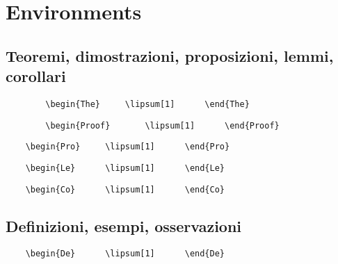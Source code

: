 \chapter{Environments}
\section{Teoremi, dimostrazioni, proposizioni, lemmi, corollari}
	\begin{verbatim}
		\begin{The}		\lipsum[1]		\end{The}
	\end{verbatim}
\begin{The}		\lipsum[1]		\end{The}

	\begin{verbatim}
		\begin{Proof}		\lipsum[1]		\end{Proof}
	\end{verbatim}
\begin{Proof}	\lipsum[2]		\end{Proof}

\begin{verbatim}
	\begin{Pro}		\lipsum[1]		\end{Pro}
\end{verbatim}
\begin{Pro}		\lipsum[3] 		\end{Pro}

\begin{verbatim}
	\begin{Le}		\lipsum[1]		\end{Le}
\end{verbatim}
\begin{Le}			\lipsum[5]		\end{Le}

\begin{verbatim}
	\begin{Co}		\lipsum[1]		\end{Co}
\end{verbatim}
\begin{Co}		\lipsum[6]		\end{Co}
\section{Definizioni, esempi, osservazioni}
\begin{verbatim}
	\begin{De}		\lipsum[1]		\end{De}
\end{verbatim}
\begin{De}		\lipsum[7]		\end{De}


